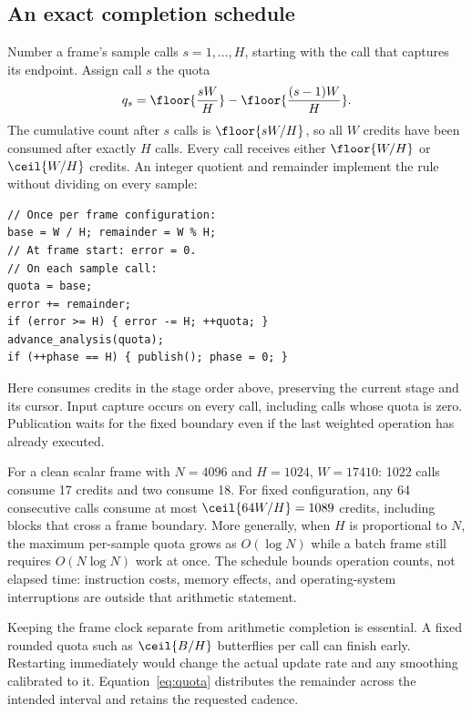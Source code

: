 \subsection{An exact completion schedule}
Number a frame's sample calls $s=1,\ldots,H$, starting with the call that
captures its endpoint. Assign call $s$ the quota
\begin{equation}
 q_s=\floor{\frac{sW}{H}}-\floor{\frac{(s-1)W}{H}}.
 \label{eq:quota}
\end{equation}
The cumulative count after $s$ calls is $\floor{sW/H}$, so all $W$ credits
have been consumed after exactly $H$ calls. Every call receives either
$\floor{W/H}$ or $\ceil{W/H}$ credits. An integer quotient and remainder
implement the rule without dividing on every sample:
\begin{lstlisting}
// Once per frame configuration:
base = W / H; remainder = W % H;
// At frame start: error = 0.
// On each sample call:
quota = base;
error += remainder;
if (error >= H) { error -= H; ++quota; }
advance_analysis(quota);
if (++phase == H) { publish(); phase = 0; }
\end{lstlisting}
Here  consumes credits in the stage order above,
preserving the current stage and its cursor. Input capture occurs on every
call, including calls whose quota is zero. Publication waits for the fixed
boundary even if the last weighted operation has already executed.

For a clean scalar frame with $N=4096$ and $H=1024$, $W=17410$:
1022 calls consume 17 credits and two consume 18. For fixed configuration,
any 64 consecutive calls consume at most
$\ceil{64W/H}=1089$ credits, including blocks that cross a frame boundary.
More generally, when $H$ is proportional to $N$, the maximum per-sample
quota grows as $O(\log N)$ while a batch frame still requires
$O(N\log N)$ work at once. The schedule bounds operation counts, not
elapsed time: instruction costs, memory effects, and operating-system
interruptions are outside that arithmetic statement.

Keeping the frame clock separate from arithmetic completion is essential.
A fixed rounded quota such as $\ceil{B/H}$ butterflies per call can finish
early. Restarting immediately would change the actual update rate and any
smoothing calibrated to it. Equation~\eqref{eq:quota} distributes the
remainder across the intended interval and retains the requested cadence.

